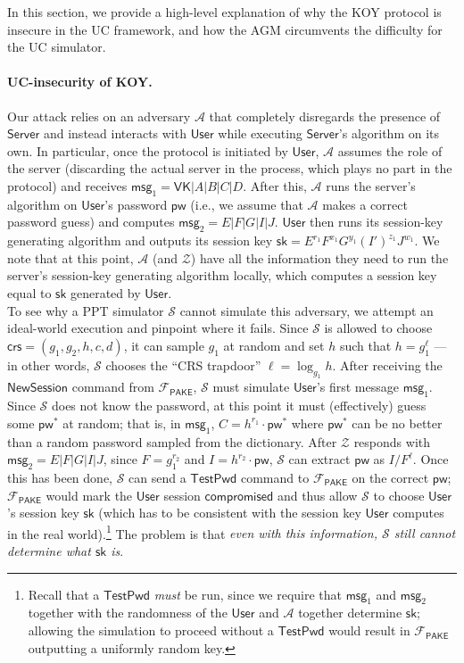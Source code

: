 \documentclass[12pt,a4paper]{article}
\newcommand{\simulator}{\mathcal{S}}
\newcommand{\env}{\mathcal{Z}}
\newcommand{\adv}{\mathcal{A}}
\newcommand{\pake}{\mathcal{F}_{\mathsf{PAKE}}}
\newcommand{\user}{\mathsf{User}}
\newcommand{\sk}{\mathsf{sk}}
\newcommand{\pw}{\mathsf{pw}}
\newcommand{\crs}{\mathsf{crs}}
\newcommand{\newsession}{\mathsf{NewSession}}
\newcommand{\testpwd}{\mathsf{TestPwd}}
\newcommand{\compromised}{\mathsf{compromised}}
\newcommand{\server}{\mathsf{Server}}
\newcommand{\msg}[1]{\mathsf{msg}_{#1}}
\begin{document}
In this section, we provide a high-level explanation of why the KOY protocol is insecure in the UC framework, and how the AGM circumvents the difficulty for the UC simulator.

	\paragraph{UC-insecurity of KOY.}
	Our attack relies on an adversary $\adv$ that completely disregards the presence of $\server$ and instead interacts with $\user$ while executing $\server$'s algorithm on its own. In particular, once the protocol is initiated by $\user$, $\adv$ assumes the role of the server (discarding the actual server in the process, which plays no part in the protocol) and receives $\msg{1} = \mathsf{VK}|A|B|C|D$. After this, $\adv$ runs the server's algorithm on $\user$'s password $\pw$ (i.e., we assume that $\adv$ makes a correct password guess) and computes $\msg{2} = E|F|G|I|J$. $\user$ then runs its session-key generating algorithm and outputs its session key $\sk = E^{r_1}F^{x_1}G^{y_1}(I')^{z_1}J^{w_1}$. We note that at this point, $\adv$ (and $\env$) have all the information they need to run the server's session-key generating algorithm locally, which computes a session key equal to $\sk$ generated by $\user$.\\
	
	To see why a PPT simulator $\simulator$ cannot simulate this adversary, we attempt an ideal-world execution and pinpoint where it fails. Since $\simulator$ is allowed to choose $\crs=(g_1, g_2, h, c, d)$, it can sample $g_1$ at random and set $h$ such that $h=g_1^{\ell}$ --- in other words, $\simulator$ chooses the ``CRS trapdoor'' $\ell = \log_{g_1} h$. After receiving the $\newsession$ command from $\pake$, $\simulator$ must simulate $\user$'s first message $\msg{1}$. Since $\simulator$ does not know the password, at this point it must (effectively) guess some $\pw^*$ at random; that is, in $\msg{1}$, $C=h^{r_1}\cdot\pw^*$ where $\pw^*$ can be no better than a random password sampled from the dictionary. After $\env$ responds with $\msg{2} = E|F|G|I|J$, since $F = g_1^{r_2}$ and $I = h^{r_2} \cdot \pw$, $\simulator$ can extract $\pw$ as $I/F^\ell$. Once this has been done, $\simulator$ can send a $\testpwd$ command to $\pake$ on the correct $\pw$; $\pake$ would mark the $\user$ session $\compromised$ and thus allow $\simulator$ to choose $\user$'s session key $\sk$ (which has to be consistent with the session key $\user$ computes in the real world).\footnote{Recall that a $\testpwd$ \textit{must} be run, since we require that $\msg{1}$ and $\msg{2}$ together with the randomness of the $\user$ and $\adv$ together determine $\sk$; allowing the simulation to proceed without a $\testpwd$ would result in $\pake$ outputting a uniformly random key.} The problem is that \emph{even with this information, $\simulator$ still cannot determine what $\sk$ is}.\\
\end{document}
